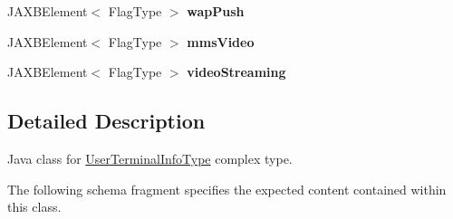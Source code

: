 \begin{DoxyCompactItemize}
\item 
\hypertarget{classcom_1_1telefonica_1_1schemas_1_1unica_1_1rest_1_1directory_1_1v1_1_1UserTerminalInfoType_aba00ae31863c4bb49bd03eb6382e7c47}{
JAXBElement$<$ FlagType $>$ {\bfseries wapPush}}
\label{classcom_1_1telefonica_1_1schemas_1_1unica_1_1rest_1_1directory_1_1v1_1_1UserTerminalInfoType_aba00ae31863c4bb49bd03eb6382e7c47}

\item 
\hypertarget{classcom_1_1telefonica_1_1schemas_1_1unica_1_1rest_1_1directory_1_1v1_1_1UserTerminalInfoType_abb7c2d7c6b53f4e267d8019f1c42a6ab}{
JAXBElement$<$ FlagType $>$ {\bfseries mmsVideo}}
\label{classcom_1_1telefonica_1_1schemas_1_1unica_1_1rest_1_1directory_1_1v1_1_1UserTerminalInfoType_abb7c2d7c6b53f4e267d8019f1c42a6ab}

\item 
\hypertarget{classcom_1_1telefonica_1_1schemas_1_1unica_1_1rest_1_1directory_1_1v1_1_1UserTerminalInfoType_a275dcde3987ee3a8d1fd6d69f169ba97}{
JAXBElement$<$ FlagType $>$ {\bfseries videoStreaming}}
\label{classcom_1_1telefonica_1_1schemas_1_1unica_1_1rest_1_1directory_1_1v1_1_1UserTerminalInfoType_a275dcde3987ee3a8d1fd6d69f169ba97}

\end{DoxyCompactItemize}


\subsection{Detailed Description}
Java class for \hyperlink{classcom_1_1telefonica_1_1schemas_1_1unica_1_1rest_1_1directory_1_1v1_1_1UserTerminalInfoType}{UserTerminalInfoType} complex type.

The following schema fragment specifies the expected content contained within this class.


